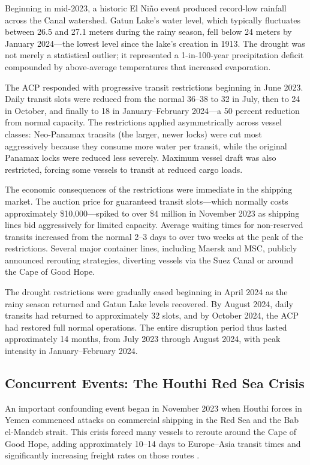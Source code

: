 \documentclass[12pt]{article}
\begin{document}
Beginning in mid-2023, a historic El Ni\~{n}o event produced record-low rainfall across the Canal watershed. Gatun Lake's water level, which typically fluctuates between 26.5 and 27.1 meters during the rainy season, fell below 24 meters by January 2024---the lowest level since the lake's creation in 1913. The drought was not merely a statistical outlier; it represented a 1-in-100-year precipitation deficit compounded by above-average temperatures that increased evaporation.

The ACP responded with progressive transit restrictions beginning in June 2023. Daily transit slots were reduced from the normal 36--38 to 32 in July, then to 24 in October, and finally to 18 in January--February 2024---a 50 percent reduction from normal capacity. The restrictions applied asymmetrically across vessel classes: Neo-Panamax transits (the larger, newer locks) were cut most aggressively because they consume more water per transit, while the original Panamax locks were reduced less severely. Maximum vessel draft was also restricted, forcing some vessels to transit at reduced cargo loads.

The economic consequences of the restrictions were immediate in the shipping market. The auction price for guaranteed transit slots---which normally costs approximately \$10,000---spiked to over \$4 million in November 2023 as shipping lines bid aggressively for limited capacity. Average waiting times for non-reserved transits increased from the normal 2--3 days to over two weeks at the peak of the restrictions. Several major container lines, including Maersk and MSC, publicly announced rerouting strategies, diverting vessels via the Suez Canal or around the Cape of Good Hope.

The drought restrictions were gradually eased beginning in April 2024 as the rainy season returned and Gatun Lake levels recovered. By August 2024, daily transits had returned to approximately 32 slots, and by October 2024, the ACP had restored full normal operations. The entire disruption period thus lasted approximately 14 months, from July 2023 through August 2024, with peak intensity in January--February 2024.

\subsection{Concurrent Events: The Houthi Red Sea Crisis}

An important confounding event began in November 2023 when Houthi forces in Yemen commenced attacks on commercial shipping in the Red Sea and the Bab el-Mandeb strait. This crisis forced many vessels to reroute around the Cape of Good Hope, adding approximately 10--14 days to Europe--Asia transit times and significantly increasing freight rates on those routes \citep{fajgelbaum2024trade}.
\end{document}
